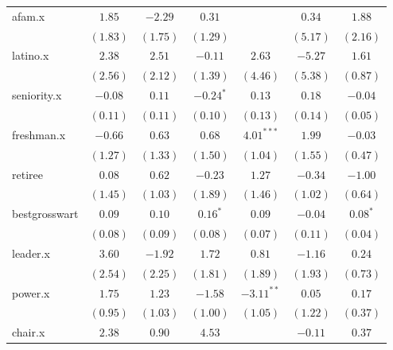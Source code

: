\documentclass[12pt]{article}
\begin{document}
\begin{table}
\begin{center}
\begin{tabular}{l c c c c c c }
			afam.x                      & $1.85$        & $-2.29$       & $0.31$        &                & $0.34$         & $1.88$        \\
			& $(1.83)$      & $(1.75)$      & $(1.29)$      &                & $(5.17)$       & $(2.16)$      \\
			latino.x                    & $2.38$        & $2.51$        & $-0.11$       & $2.63$         & $-5.27$        & $1.61$        \\
			& $(2.56)$      & $(2.12)$      & $(1.39)$      & $(4.46)$       & $(5.38)$       & $(0.87)$      \\
			seniority.x                 & $-0.08$       & $0.11$        & $-0.24^{*}$   & $0.13$         & $0.18$         & $-0.04$       \\
			& $(0.11)$      & $(0.11)$      & $(0.10)$      & $(0.13)$       & $(0.14)$       & $(0.05)$      \\
			freshman.x                  & $-0.66$       & $0.63$        & $0.68$        & $4.01^{***}$   & $1.99$         & $-0.03$       \\
			& $(1.27)$      & $(1.33)$      & $(1.50)$      & $(1.04)$       & $(1.55)$       & $(0.47)$      \\
			retiree                     & $0.08$        & $0.62$        & $-0.23$       & $1.27$         & $-0.34$        & $-1.00$       \\
			& $(1.45)$      & $(1.03)$      & $(1.89)$      & $(1.46)$       & $(1.02)$       & $(0.64)$      \\
			bestgrosswart               & $0.09$        & $0.10$        & $0.16^{*}$    & $0.09$         & $-0.04$        & $0.08^{*}$    \\
			& $(0.08)$      & $(0.09)$      & $(0.08)$      & $(0.07)$       & $(0.11)$       & $(0.04)$      \\
			leader.x                    & $3.60$        & $-1.92$       & $1.72$        & $0.81$         & $-1.16$        & $0.24$        \\
			& $(2.54)$      & $(2.25)$      & $(1.81)$      & $(1.89)$       & $(1.93)$       & $(0.73)$      \\
			power.x                     & $1.75$        & $1.23$        & $-1.58$       & $-3.11^{**}$   & $0.05$         & $0.17$        \\
			& $(0.95)$      & $(1.03)$      & $(1.00)$      & $(1.05)$       & $(1.22)$       & $(0.37)$      \\
			chair.x                     & $2.38$        & $0.90$        & $4.53$        &                & $-0.11$        & $0.37$        \\

\end{tabular}
\end{center}
\end{table}
\end{document}
